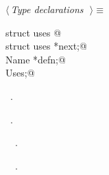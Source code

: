 \documentclass{report}
\begin{document}
\begin{flushleft} \small
\begin{minipage}{\linewidth} \label{scrap228}
$\langle\,${\it Type declarations}\nobreak\ {\footnotesize {}}$\,\rangle\equiv$
\vspace{-1ex}
\begin{list}{}{} \item
\mbox{}\verb@typedef struct uses {@\\
\mbox{}\verb@  struct uses *next;@\\
\mbox{}\verb@  Name *defn;@\\
\mbox{}\verb@} Uses;@\\
\mbox{}\verb@@{\NWsep}
\end{list}
\vspace{-1ex}
\footnotesize\addtolength{\baselineskip}{-1ex}
\begin{list}{}{\setlength{\itemsep}{-\parsep}\setlength{\itemindent}{-\leftmargin}}
\item \NWtxtMacroDefBy\ .
\item \NWtxtMacroRefIn\ .
\end{list}
\vspace{-2ex}
\footnotesize\addtolength{\baselineskip}{-1ex}
\begin{list}{}{\setlength{\itemsep}{-\parsep}\setlength{\itemindent}{-\leftmargin}}
\item \NWtxtIdentsDefed\nobreak\  \verb@Uses@\nobreak\ .\end{list}
\vspace{-2ex}
\footnotesize\addtolength{\baselineskip}{-1ex}
\begin{list}{}{\setlength{\itemsep}{-\parsep}\setlength{\itemindent}{-\leftmargin}}
\item \NWtxtIdentsUsed\nobreak\  \verb@Name@\nobreak\ .\end{list}
\end{minipage}\\[4ex]
\end{flushleft}
\end{document}
